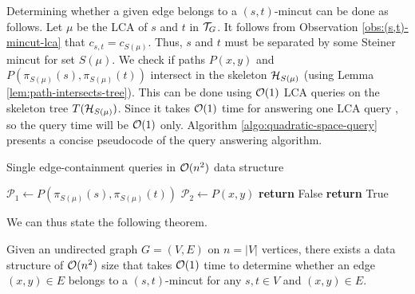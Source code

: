 
Determining whether a given edge belongs to a $(s,t)$-mincut can be done as follows. Let $\mu$ be the LCA of $s$ and $t$ in ${\cal T}_G$. It follows from Observation \ref{obs:(s,t)-mincut-lca} that $c_{s,t}=c_{S(\mu)}$. Thus, $s$ and $t$ must be separated by some Steiner mincut for set $S(\mu)$. We check if paths $P(x,y)$ and $P(\pi_{S(\mu)}(s),\pi_{S(\mu)}(t))$ intersect in the skeleton ${\cal H}_{S(\mu)}$ (using Lemma \ref{lem:path-intersects-tree}). This can be done using ${\cal O}(1)$ LCA queries on the skeleton tree $T({\cal H}_{S(\mu)})$. Since it takes ${\cal O}(1)$ time for answering one LCA query \cite{DBLP:journals/jal/BenderFPSS05}, so the query time will be ${\cal O}(1)$ only. Algorithm \ref{algo:quadratic-space-query} presents a concise pseudocode of the query answering algorithm.

\begin{algorithm}%
    \caption{Single edge-containment queries in ${\cal O}(n^2)$ data structure}
    \label{algo:quadratic-space-query}
    \begin{algorithmic}[1] %
            \State $\mathcal P_1 \gets P(\pi_{S(\mu)}(s),\pi_{S(\mu)}(t))$
            \State $\mathcal P_2 \gets P(x,y)$
            \State \textbf{return} False
            \Else 
            \State \textbf{ return} True
            \EndIf
        \EndProcedure
    \end{algorithmic}
\end{algorithm}
We can thus state the following theorem.
\begin{theorem}
 Given an undirected graph $G=(V,E)$ on $n=|V|$ vertices, there exists a data structure of 
${\cal O}(n^2)$ size that takes ${\cal O}(1)$ time to determine whether an edge $(x,y)\in E$
belongs to a $(s,t)$-mincut for any $s,t\in V$
and $(x,y)\in E$.
\end{theorem}


